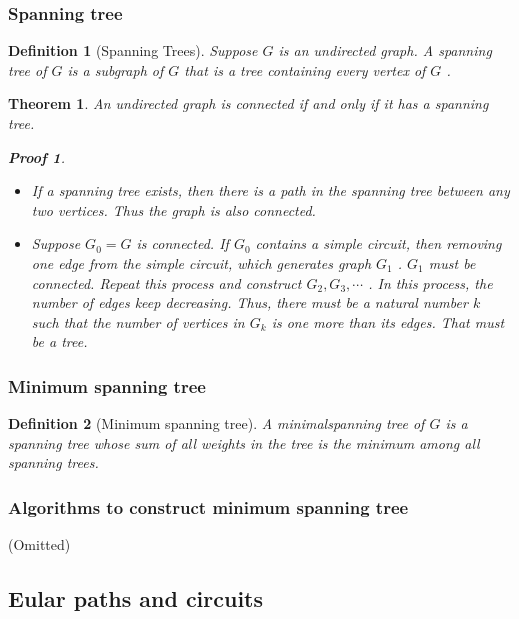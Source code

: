 \documentclass{ctexart}
\newcommand{\。}{．} %
\newenvironment{kuang3}{
    \begin{tcolorbox}[enhanced, breakable, colback=hlan!5!white, boxrule=0pt, frame hidden,
        borderline south={0.5mm}{0.1mm}{hlan}]
    }
    {\end{tcolorbox}}
\newenvironment{lvse}{
    \begin{tcolorbox}[enhanced, breakable, colback=qlv, boxrule=0pt, frame hidden,
        borderline west={0.7mm}{0.1mm}{slv}]
    }
    {\end{tcolorbox}}
\newenvironment{huangse}{
    \begin{tcolorbox}[enhanced, breakable, colback=qhuang, boxrule=0pt, frame hidden,
        borderline west={0.7mm}{0.1mm}{shuang}]
    }
    {\end{tcolorbox}}
\theoremstyle{t} %
\newtheorem{dyhj}{\color{slv} Definition}[subsection] %
\newtheorem{dlhj}{\color{shuang} Theorem}[subsection]
\newtheorem*{zmhj}{\color{slan} Proof}
\newenvironment{dy}{\begin{lvse}\begin{dyhj}}{\end{dyhj}\end{lvse}}
\newenvironment{dl}{\begin{huangse}\begin{dlhj}}{\end{dlhj}\end{huangse}}
\begin{document}
\subsubsection{Spanning tree}


\begin{dy}[Spanning Trees]
    Suppose  $ G $  is an undirected graph. A spanning tree of  $ G $  is a subgraph of  $ G $  that is a tree containing every vertex of  $ G $ .
\end{dy}
    
\begin{dl}
    An undirected graph is connected if and only if it has a spanning tree.
    \begin{zmhj} \quad
        \begin{itemize}
            \item If a spanning tree exists, then there is a path in the spanning tree between any two vertices. Thus the graph is also connected.
            \item Suppose  $ G_0 = G $  is connected. If  $ G_0 $  contains a simple circuit, then removing one edge from the simple circuit, which generates graph  $ G_1 $ .  $ G_1 $  must be connected. Repeat this process and construct  $ G_2, G_3, \cdots $ . In this process, the number of edges keep decreasing. Thus, there must be a natural number  $ k $  such that the number of vertices in  $ G_k $  is one more than its edges. That must be a tree.
        \end{itemize}
    \end{zmhj}
\end{dl}

\subsubsection{Minimum spanning tree}

\begin{dy}[Minimum spanning tree]
    A minimalspanning tree of $G$ is a spanning tree whose sum of all weights in the tree is the minimum among all spanning trees.
\end{dy}

\subsubsection{Algorithms to construct minimum spanning tree}

(Omitted)

\begin{kuang3}
    \subsection{Eular paths and circuits}
\end{kuang3}
\end{document}
